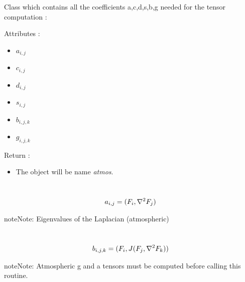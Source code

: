 \documentclass[letterpaper,10pt,english]{sphinxmanual}
\begin{document}
\begin{fulllineitems}
\label{rstfiles/inprod_analytic:inprod_analytic.atm_tensors}
Class which contains all the coefficients
a,c,d,s,b,g needed for the tensor computation :

Attributes :
\begin{itemize}
\item {} 
\(a_{i, j}\)

\item {} 
\(c_{i, j}\)

\item {} 
\(d_{i, j}\)

\item {} 
\(s_{i, j}\)

\item {} 
\(b_{i, j, k}\)

\item {} 
\(g_{i, j, k}\)

\end{itemize}

Return :
\begin{itemize}
\item {} 
The object will be name \emph{atmos}.

\end{itemize}

\begin{fulllineitems}
\label{rstfiles/inprod_analytic:inprod_analytic.atm_tensors.calculate_a}~\begin{gather}
\begin{split}a_{i, j} = (F_i, {\nabla}^2 F_j)\end{split}\notag
\end{gather}
\begin{notice}{note}{Note:}
Eigenvalues of the Laplacian (atmospheric)
\end{notice}

\end{fulllineitems}


\begin{fulllineitems}
\label{rstfiles/inprod_analytic:inprod_analytic.atm_tensors.calculate_b}~\begin{gather}
\begin{split}b_{i, j, k} = (F_i, J(F_j, \nabla^2 F_k))\end{split}\notag
\end{gather}
\begin{notice}{note}{Note:}
Atmospheric g and a tensors must be computed before calling this routine.
\end{notice}


\end{fulllineitems}
\end{fulllineitems}
\end{document}
